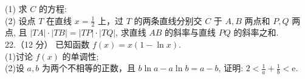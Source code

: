 \documentclass[UTF8]{ctexart}
\begin{document}
	(1) 求 $C$ 的方程:\\
	
	(2) 设点 $T$ 在直线 $x=\displaystyle{\frac{1}{2}}$ 上，过 $T$ 的两条直线分别交 $C$ 于 $A, B$ 两点和 $P, Q$ 两点,
	且 $|T A| \cdot|T B|=|T P| \cdot|T Q|$, 求直线 $A B$ 的斜率与直线 $P Q$ 的斜率之和.\\
	
	22.（12 分）
	已知函数 $f(x)=x(1-\ln x)$.\\
	
	(1)讨论 $f(x)$ 的单调性;\\
	
	(2)设 $a, b$ 为两个不相等的正数，且 $b \ln a-a \ln b=a-b$, 证明: $2<\displaystyle{\frac{1}{a}}+\displaystyle{\frac{1}{b}}<\mathrm{e} .$\\
	
	
\end{document}

